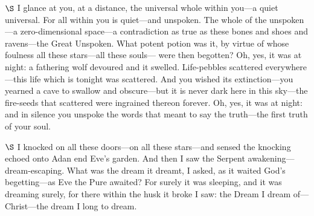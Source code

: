 \documentclass[a4paper]{article}
\begin{document}
$\S$ I glance at you, at a distance, the universal whole within you---a quiet
universal. For all within you is quiet---and unspoken. The whole of the
unspoken---a zero-dimensional space---a contradiction as true
as these bones and shoes and ravens---the Great Unspoken. What
potent potion was it, by virtue of whose foulness all these stars---all these
souls--- were then begotten? Oh, yes, it was at night: a fathering wolf
devoured and it swelled. Life-pebbles scattered everywhere---this life which is
tonight was scattered. And you wished its extinction---you yearned a cave to
swallow and obscure---but it is never dark here in this sky---the fire-seeds
that scattered were ingrained thereon forever. Oh, yes, it was at night: and in
silence you unspoke the words that meant to say the truth---the first truth of
your soul. 

$\S$ I knocked on all these doors---on all these stars---and sensed the knocking
echoed onto Adan end Eve's garden. And then I saw the Serpent
awakening---dream-escaping. What was the dream it dreamt, I asked,
as it waited God's begetting---as Eve the Pure awaited? For surely it was
sleeping, and it was dreaming surely, for there within the husk it broke I saw:
the Dream I dream of---Christ---the dream I long to dream.

    
\end{document}
